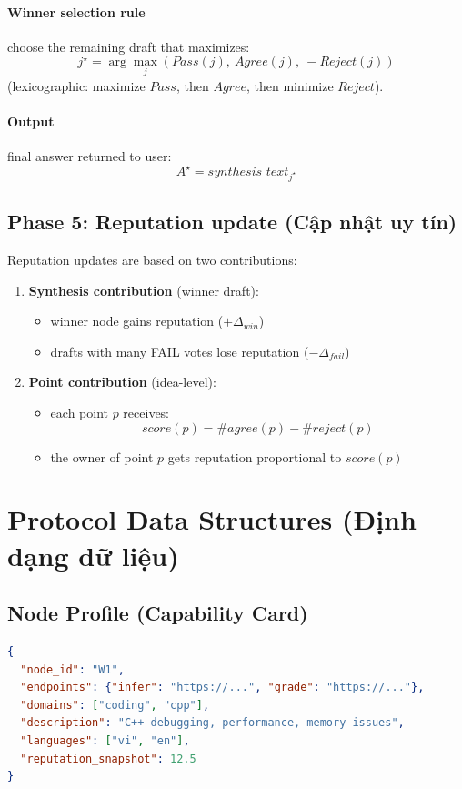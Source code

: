 \documentclass[11pt]{article}
\begin{document}
\paragraph{Winner selection rule} choose the remaining draft that maximizes:
\[
j^\star = \arg\max_j \left( Pass(j),\ Agree(j),\ -Reject(j) \right)
\]
(lexicographic: maximize \(Pass\), then \(Agree\), then minimize \(Reject\)).

\paragraph{Output} final answer returned to user:
\[
A^\star = synthesis\_text_{j^\star}
\]

\subsection{Phase 5: Reputation update (Cập nhật uy tín)}
Reputation updates are based on two contributions:
\begin{enumerate}[leftmargin=1.2em]
  \item \textbf{Synthesis contribution} (winner draft):
  \begin{itemize}[leftmargin=1.2em]
    \item winner node gains reputation (\(+\Delta_{win}\))
    \item drafts with many FAIL votes lose reputation (\(-\Delta_{fail}\))
  \end{itemize}
  \item \textbf{Point contribution} (idea-level):
  \begin{itemize}[leftmargin=1.2em]
    \item each point \(p\) receives:
    \[
    score(p) = \#agree(p) - \#reject(p)
    \]
    \item the owner of point \(p\) gets reputation proportional to \(score(p)\)
  \end{itemize}
\end{enumerate}

\section{Protocol Data Structures (Định dạng dữ liệu)}
\subsection{Node Profile (Capability Card)}
\begin{lstlisting}[language=json]
{
  "node_id": "W1",
  "endpoints": {"infer": "https://...", "grade": "https://..."},
  "domains": ["coding", "cpp"],
  "description": "C++ debugging, performance, memory issues",
  "languages": ["vi", "en"],
  "reputation_snapshot": 12.5
}
\end{lstlisting}
\end{document}
